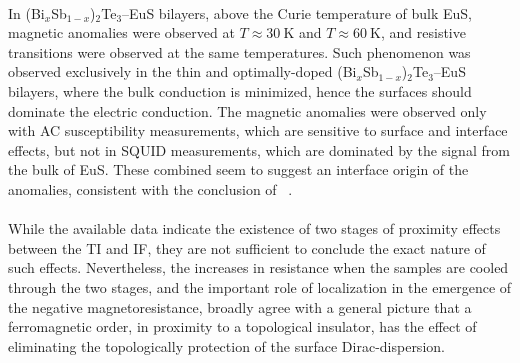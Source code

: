 \paragraph{}
In (Bi$_x$Sb$_{1-x}$)$_2$Te$_3$--EuS bilayers, above the Curie temperature of bulk EuS, magnetic anomalies were observed at $T\approx30~\mathrm{K}$ and $T\approx60~\mathrm{K}$, and resistive transitions were observed at the same temperatures. Such phenomenon was observed exclusively in the thin and optimally-doped (Bi$_x$Sb$_{1-x}$)$_2$Te$_3$--EuS bilayers, where the bulk conduction is minimized, hence the surfaces should dominate the electric conduction. The magnetic anomalies were observed only with AC susceptibility measurements, which are sensitive to surface and interface effects, but not in SQUID measurements, which are dominated by the signal from the bulk of EuS. These combined seem to suggest an interface origin of the anomalies, consistent with the conclusion of \citeauthor{Moodera2016}~\cite{Moodera2016}.

\paragraph{}
While the available data indicate the existence of two stages of proximity effects between the TI and IF, they are not sufficient to conclude the exact nature of such effects. Nevertheless, the increases in resistance when the samples are cooled through the two stages, and the important role of localization in the emergence of the negative magnetoresistance, broadly agree with a general picture that a ferromagnetic order, in proximity to a topological insulator, has the effect of eliminating the topologically protection of the surface Dirac-dispersion.
